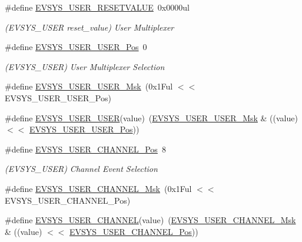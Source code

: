 \begin{DoxyCompactItemize}
\#define \mbox{\hyperlink{group___s_a_m_d21___e_v_s_y_s_gaf4ba09be942a94f1cb7a9ed23ac108ab}{E\+V\+S\+Y\+S\+\_\+\+U\+S\+E\+R\+\_\+\+R\+E\+S\+E\+T\+V\+A\+L\+UE}}~0x0000ul
\begin{DoxyCompactList}\small\item\em (E\+V\+S\+Y\+S\+\_\+\+U\+S\+ER reset\+\_\+value) User Multiplexer \end{DoxyCompactList}\item 
\#define \mbox{\hyperlink{group___s_a_m_d21___e_v_s_y_s_ga94aba6013d20165be7576c3eaef0e8ad}{E\+V\+S\+Y\+S\+\_\+\+U\+S\+E\+R\+\_\+\+U\+S\+E\+R\+\_\+\+Pos}}~0
\begin{DoxyCompactList}\small\item\em (E\+V\+S\+Y\+S\+\_\+\+U\+S\+ER) User Multiplexer Selection \end{DoxyCompactList}\item 
\#define \mbox{\hyperlink{group___s_a_m_d21___e_v_s_y_s_ga72b3b04430d8d89ff04d08174ead52b3}{E\+V\+S\+Y\+S\+\_\+\+U\+S\+E\+R\+\_\+\+U\+S\+E\+R\+\_\+\+Msk}}~(0x1\+Ful $<$$<$ E\+V\+S\+Y\+S\+\_\+\+U\+S\+E\+R\+\_\+\+U\+S\+E\+R\+\_\+\+Pos)
\item 
\#define \mbox{\hyperlink{group___s_a_m_d21___e_v_s_y_s_ga2b089f81630cf140cca5c184c8a114e2}{E\+V\+S\+Y\+S\+\_\+\+U\+S\+E\+R\+\_\+\+U\+S\+ER}}(value)~(\mbox{\hyperlink{group___s_a_m_d21___e_v_s_y_s_ga72b3b04430d8d89ff04d08174ead52b3}{E\+V\+S\+Y\+S\+\_\+\+U\+S\+E\+R\+\_\+\+U\+S\+E\+R\+\_\+\+Msk}} \& ((value) $<$$<$ \mbox{\hyperlink{group___s_a_m_d21___e_v_s_y_s_ga94aba6013d20165be7576c3eaef0e8ad}{E\+V\+S\+Y\+S\+\_\+\+U\+S\+E\+R\+\_\+\+U\+S\+E\+R\+\_\+\+Pos}}))
\item 
\#define \mbox{\hyperlink{group___s_a_m_d21___e_v_s_y_s_ga4ce28148cd49044148eed72085814831}{E\+V\+S\+Y\+S\+\_\+\+U\+S\+E\+R\+\_\+\+C\+H\+A\+N\+N\+E\+L\+\_\+\+Pos}}~8
\begin{DoxyCompactList}\small\item\em (E\+V\+S\+Y\+S\+\_\+\+U\+S\+ER) Channel Event Selection \end{DoxyCompactList}\item 
\#define \mbox{\hyperlink{group___s_a_m_d21___e_v_s_y_s_ga255273a4399694d342bbccdda41108b8}{E\+V\+S\+Y\+S\+\_\+\+U\+S\+E\+R\+\_\+\+C\+H\+A\+N\+N\+E\+L\+\_\+\+Msk}}~(0x1\+Ful $<$$<$ E\+V\+S\+Y\+S\+\_\+\+U\+S\+E\+R\+\_\+\+C\+H\+A\+N\+N\+E\+L\+\_\+\+Pos)
\item 
\#define \mbox{\hyperlink{group___s_a_m_d21___e_v_s_y_s_ga940b872aa3d233451a79a53fdf82001b}{E\+V\+S\+Y\+S\+\_\+\+U\+S\+E\+R\+\_\+\+C\+H\+A\+N\+N\+EL}}(value)~(\mbox{\hyperlink{group___s_a_m_d21___e_v_s_y_s_ga255273a4399694d342bbccdda41108b8}{E\+V\+S\+Y\+S\+\_\+\+U\+S\+E\+R\+\_\+\+C\+H\+A\+N\+N\+E\+L\+\_\+\+Msk}} \& ((value) $<$$<$ \mbox{\hyperlink{group___s_a_m_d21___e_v_s_y_s_ga4ce28148cd49044148eed72085814831}{E\+V\+S\+Y\+S\+\_\+\+U\+S\+E\+R\+\_\+\+C\+H\+A\+N\+N\+E\+L\+\_\+\+Pos}}))

\end{DoxyCompactItemize}
